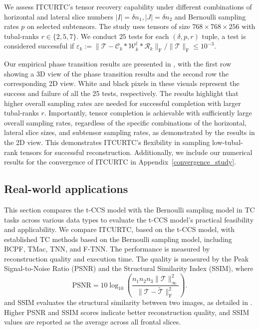 \documentclass[twoside,12pt]{article}
\def\fro{{\mathrm{F}}}
\def\fro{{\mathrm{F}}}
\begin{document}
We assess ITCURTC's tensor recovery capability under different combinations of horizontal and lateral slice numbers \(|I| = \delta n_{1}, |J| = \delta n_{2}\) and Bernoulli sampling rates \(p\) on selected subtensors. The study uses tensors of size \(768 \times 768\times 256\) with tubal-ranks \(r \in\{2,5, 7\}\). We conduct $25$ tests for each \((\delta,p,r)\) tuple, a test is considered successful if  
$
\varepsilon_k:={\|\mathcal{T}-\mathcal{C}_k* \mathcal{W}_k^{\dagger}* \mathcal{R}_k\|_{\fro}}/{\|\mathcal{T}\|_{\fro}}\leq 10^{-3}$.   
 
Our empirical phase transition results are presented in , with the first row showing a 3D view of the phase transition results and the second row the corresponding 2D view. White and black pixels in these visuals represent the success and failure of all the 25 tests, respectively. The results highlight that higher overall sampling rates are needed for successful completion with larger tubal-ranks \(r\). Importantly, tensor completion is achievable with sufficiently large overall sampling rates, regardless of the specific combinations of the horizontal, lateral slice sizes, and subtensor sampling rates, as demonstrated by the results in the 2D view.  This demonstrates ITCURTC's flexibility in sampling low-tubal-rank tensors for successful reconstruction. Additionally, we include our numerical results for the convergence of ITCURTC in Appendix~\ref{convergence_study}.
\subsection{Real-world applications}\label{more_experiments}
This section compares the t-CCS model with the Bernoulli sampling model in TC tasks across various data types to evaluate the t-CCS model's practical feasibility and applicability. We compare ITCURTC, based on the t-CCS model, with established TC methods based on the Bernoulli sampling model, including BCPF, TMac, TNN, and F-TNN.  The performance is measured by reconstruction quality and execution time. The quality is measured by the Peak Signal-to-Noise Ratio (PSNR) and the Structural Similarity Index (SSIM), where  
\begin{equation}\label{eqn:PSNR}
\text{PSNR} = 10 \log_{10}\left(\frac{n_{1}n_{2}n_{3}\|\mathcal{T}\|_{\infty}^2}{\|\mathcal{T}-\widetilde{\mathcal{T}}\|_{\fro}^2}\right).
\end{equation}
and SSIM evaluates the structural similarity between two images, as detailed in \citep{wang2004image}. Higher PSNR and SSIM scores indicate better reconstruction quality, and SSIM values are reported as the average across all frontal slices.
\end{document}
